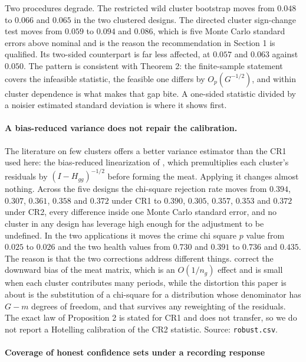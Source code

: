 \documentclass[12pt]{article}
\theoremstyle{definition}
\numberwithin{equation}{section}
\begin{document}
Two procedures degrade. The restricted wild cluster bootstrap moves from
$0.048$ to $0.066$ and $0.065$ in the two clustered designs. The directed
cluster sign-change test moves from $0.059$ to $0.094$ and $0.086$, which is
five Monte Carlo standard errors above nominal and is the reason the
recommendation in Section 1 is qualified. Its two-sided counterpart is far less affected, at $0.057$ and $0.063$ against $0.050$. The
pattern is consistent with Theorem 2: the finite-sample statement covers the infeasible statistic, the feasible one differs by
$O_p(G^{-1/2})$, and within cluster dependence is what makes that gap bite. A
one-sided statistic divided by a noisier estimated standard deviation is where
it shows first.

\paragraph{A bias-reduced variance does not repair the calibration.} The
literature on few clusters offers a better variance estimator than the CR1 used
here: the bias-reduced linearization of \citet{bell2002bias}, which premultiplies
each cluster's residuals by $(I - H_{gg})^{-1/2}$ before forming the meat.
Applying it changes almost nothing. Across the five designs the chi-square rejection rate moves from $0.394$, $0.307$, $0.361$, $0.358$ and $0.372$ under
CR1 to $0.390$, $0.305$, $0.357$, $0.353$ and $0.372$ under CR2, every
difference inside one Monte Carlo standard error, and no cluster in any design
has leverage high enough for the adjustment to be undefined. In the two
applications it moves the crime chi square $p$ value from $0.025$ to $0.026$ and
the two health values from $0.730$ and $0.391$ to $0.736$ and $0.435$. The
reason is that the two corrections address different things. \citet{bell2002bias}
correct the downward bias of the meat matrix, which is an $O(1/n_g)$ effect and
is small when each cluster contributes many periods, while the distortion this
paper is about is the substitution of a chi-square for a distribution whose
denominator has $G - m$ degrees of freedom, and that survives any reweighting of
the residuals. The exact law of Proposition 2 is stated for CR1
and does not transfer, so we do not report a Hotelling calibration of the CR2
statistic. Source: \texttt{robust.csv}.

\paragraph{Coverage of honest confidence sets under a recording response}
\end{document}
